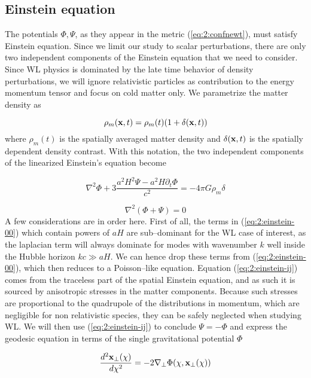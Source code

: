 \subsection{Einstein equation}
The potentials $\Phi,\Psi$, as they appear in the metric (\ref{eq:2:confnewt}), must satisfy Einstein equation. Since we limit our study to scalar perturbations, there are only two independent components of the Einstein equation that we need to consider. Since WL physics is dominated by the late time behavior of density perturbations, we will ignore relativistic particles as contribution to the energy momentum tensor and focus on cold matter only. We parametrize the matter density as 

\begin{equation}
\label{eq:2:matterrho}
\rho_m(\mathbf{x},t) = \rho_m(t)(1+\delta(\mathbf{x},t))
\end{equation}
%
where $\rho_m(t)$ is the spatially averaged matter density and $\delta(\mathbf{x},t)$ is the spatially dependent density contrast. With this notation, the two independent components of the linearized Einstein's equation become

\begin{equation}
\label{eq:2:einstein-00}
\nabla^2\Phi +3\frac{a^2H^2\Psi-a^2H\partial_t\Phi}{c^2} = -4\pi G\rho_m\delta
\end{equation}

\begin{equation}
\label{eq:2:einstein-ij}
\nabla^2(\Phi+\Psi) = 0
\end{equation}
%
A few considerations are in order here. First of all, the terms in (\ref{eq:2:einstein-00}) which contain powers of $aH$ are sub--dominant for the WL case of interest, as the laplacian term will always dominate for modes with wavenumber $k$ well inside the Hubble horizon $kc\gg aH$. We can hence drop these terms from (\ref{eq:2:einstein-00}), which then reduces to a Poisson--like equation. Equation (\ref{eq:2:einstein-ij}) comes from the traceless part of the spatial Einstein equation, and as such it is sourced by anisotropic stresses in the matter components. Because such stresses are proportional to the quadrupole of the distributions in momentum, which are negligible for non relativistic species, they can be safely neglected when studying WL. We will then use (\ref{eq:2:einstein-ij}) to conclude $\Psi=-\Phi$ and express the geodesic equation in terms of the single gravitational potential $\Phi$

\begin{equation}
\label{eq:2:geodesic-fo-3}
\frac{d^2\mathbf{x}_\perp(\chi)}{d\chi^2} = -2\nabla_\perp\Phi(\chi,\mathbf{x}_\perp(\chi))
\end{equation}

